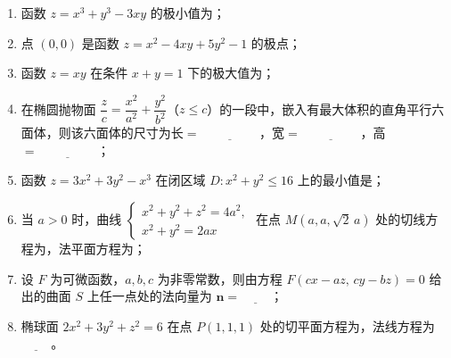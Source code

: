 \documentclass[lang=cn,11pt]{elegantbook}
\begin{document}
\begin{exercise}[极值、条件极值与曲面几何]
\begin{enumerate}
  \item 函数 $z=x^3+y^3-3xy$ 的极小值为\underline{\hspace{1cm}}；
  \item 点 $(0,0)$ 是函数 $z=x^2-4xy+5y^2-1$ 的极\underline{\hspace{1cm}}点；
  \item 函数 $z=xy$ 在条件 $x+y=1$ 下的极大值为\underline{\hspace{1cm}}；
  \item 在椭圆抛物面 $\dfrac{z}{c}=\dfrac{x^2}{a^2}+\dfrac{y^2}{b^2}$（$z\leq c$）的一段中，嵌入有最大体积的直角平行六面体，则该六面体的尺寸为长$=\underline{\hspace{2cm}}$，宽$=\underline{\hspace{2cm}}$，高$=\underline{\hspace{2cm}}$；
  \item 函数 $z=3x^2+3y^2-x^3$ 在闭区域 $D:x^2+y^2\leq 16$ 上的最小值是\underline{\hspace{1cm}}；
  \item 当 $a>0$ 时，曲线 $\begin{cases}x^2+y^2+z^2=4a^2,\\ x^2+y^2=2ax\end{cases}$ 在点 $M(a,a,\sqrt{2}\,a)$ 处的切线方程为\underline{\hspace{1cm}}，法平面方程为\underline{\hspace{1cm}}；
  \item 设 $F$ 为可微函数，$a,b,c$ 为非零常数，则由方程 $F(cx-az,\,cy-bz)=0$ 给出的曲面 $S$ 上任一点处的法向量为 $\boldsymbol n=\underline{\hspace{1cm}}$；
  \item 椭球面 $2x^2+3y^2+z^2=6$ 在点 $P(1,1,1)$ 处的切平面方程为\underline{\hspace{1cm}}，法线方程为$\underline{\hspace{1cm}}$。
\end{enumerate}
\end{exercise}
\end{document}
